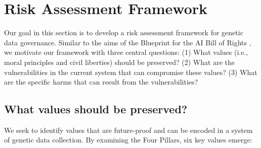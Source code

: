 \section{Risk Assessment Framework}
\label{sec:risks}

Our goal in this section is to develop a risk assessment framework for genetic data governance.
Similar to the aims of the Blueprint for the AI Bill of Rights \cite{park2023ai}, we motivate our framework with three central questions: (1) What values (i.e., moral principles and civil liberties) should be preserved? (2) What are the vulnerabilities in the current system that can compromise these values? (3) What are the specific harms that can result from the vulnerabilities? 


\subsection{What values should be preserved?}

We seek to identify values that are future-proof and can be encoded in a system of genetic data collection. By examining the Four Pillars, six key values emerge:

